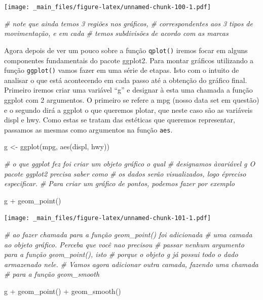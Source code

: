 \documentclass[
]{book}
\newenvironment{Shaded}{\begin{snugshade}}{\end{snugshade}}
\newcommand{\CommentTok}[1]{\textcolor[rgb]{0.56,0.35,0.01}{\textit{#1}}}
\newcommand{\FunctionTok}[1]{\textcolor[rgb]{0.00,0.00,0.00}{#1}}
\newcommand{\NormalTok}[1]{#1}
\newcommand{\OtherTok}[1]{\textcolor[rgb]{0.56,0.35,0.01}{#1}}
\newcommand{\SpecialCharTok}[1]{\textcolor[rgb]{0.00,0.00,0.00}{#1}}
\begin{document}
\texttt{[image: \_main\_files/figure-latex/unnamed-chunk-100-1.pdf]}

\begin{Shaded}
\begin{Highlighting}[]
\CommentTok{\# note que ainda temos 3 regiões nos gráficos,}
\CommentTok{\# correspondentes aos 3 tipos de movimentação, e em cada}
\CommentTok{\# temos subdivisões de acordo com as marcas}
\end{Highlighting}
\end{Shaded}

Agora depois de ver um pouco sobre a função \texttt{qplot()} iremos focar em alguns componentes fundamentais do pacote ggplot2. Para montar gráficos utilizando a função \texttt{ggplot()} vamos fazer em uma série de etapas. Isto com o intuito de analisar o que está acontecendo em cada passo até a obtenção do gráfico final. Primeiro iremos criar uma variável ``g'' e designar à esta uma chamada a função ggplot com 2 argumentos. O primeiro se refere a mpg (nosso data set em questão) e o segundo dirá a ggplot o que queremos plotar, que neste caso são as variáveis displ e hwy. Como estas se tratam das estéticas que queremos representar, passamos as mesmas como argumentos na função \texttt{aes}.

\begin{Shaded}
\begin{Highlighting}[]
\NormalTok{g }\OtherTok{\textless{}{-}} \FunctionTok{ggplot}\NormalTok{(mpg, }\FunctionTok{aes}\NormalTok{(displ, hwy))}

\CommentTok{\# o que ggplot fez foi criar um objeto gráfico o qual}
\CommentTok{\# designamos àvariável g O pacote ggplot2 precisa saber como}
\CommentTok{\# os dados serão visualizados, logo épreciso especificar.}
\CommentTok{\# Para criar um gráfico de pontos, podemos fazer por exemplo}

\NormalTok{g }\SpecialCharTok{+} \FunctionTok{geom\_point}\NormalTok{()}
\end{Highlighting}
\end{Shaded}

\texttt{[image: \_main\_files/figure-latex/unnamed-chunk-101-1.pdf]}

\begin{Shaded}
\begin{Highlighting}[]
\CommentTok{\# ao fazer chamada para a função geom\_point() foi adicionada}
\CommentTok{\# uma camada ao objeto gráfico. Perceba que você nao precisou}
\CommentTok{\# passar nenhum argumento para a função geom\_point(), isto}
\CommentTok{\# porque o objeto g já possui todo o dado armazenado nele.}
\CommentTok{\# Vamos agora adicionar outra camada, fazendo uma chamada}
\CommentTok{\# para a função geom\_smooth}

\NormalTok{g }\SpecialCharTok{+} \FunctionTok{geom\_point}\NormalTok{() }\SpecialCharTok{+} \FunctionTok{geom\_smooth}\NormalTok{()}
\end{Highlighting}
\end{Shaded}
\end{document}
